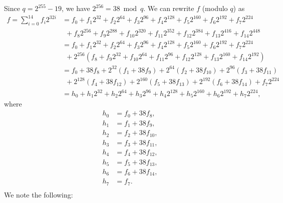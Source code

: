 \documentclass[a4paper, 12pt]{article}
\begin{document}
Since $q = 2^{255}-19$, we have $2^{256} = 38 \bmod q$. We can rewrite $f$ (modulo $q$) as
\begin{align*}
  f  = \sum^{14}_{i=0} f_i 2^{32i} &= f_0 + f_1 2^{32} + f_2 2^{64} + f_3 2^{96} + f_4 2^{128} +   f_5 2^{160} + f_6 2^{192}+ f_7 2^{224}\\
   &\ \ + f_8 2^{256} + f_9 2^{288} + f_{10} 2^{320} + f_{11} 2^{352} +   f_{12} 2^{384} + f_{13} 2^{416}+ f_{14} 2^{448}\\
   & = f_0 + f_1 2^{32} + f_2 2^{64} + f_3 2^{96} + f_4 2^{128} +   f_5 2^{160} + f_6 2^{192}+ f_7 2^{224}\\
   &\ \ + 2^{256} \left( f_8 + f_9 2^{32} + f_{10} 2^{64} + f_{11} 2^{96} +   f_{12} 2^{128} + f_{13} 2^{160}+ f_{14} 2^{192} \right)\\
   & = f_0 + 38f_8 + 2^{32}\left(f_1 + 38 f_9\right)  +  2^{64}\left( f_2 + 38 f_{10} \right) + 2^{96}\left( f_3 + 38 f_{11} \right)\\
   &\ \ +  2^{128}\left( f_4 + 38 f_{12}\right) + 2^{160}\left( f_5 + 38 f_{13} \right) + 2^{192}\left( f_6 + 38 f_{14} \right) + f_7 2^{224}\\
   & = h_0 + h_1 2^{32} + h_2 2^{64} + h_3 2^{96} + h_4 2^{128} +   h_5 2^{160} + h_6 2^{192}+ h_7 2^{224},
\end{align*}
where
\begin{align*}
  h_0 & = f_0 + 38 f_8,\\
  h_1 & = f_1 + 38 f_9,\\
  h_2 & = f_2 + 38 f_{10},\\
  h_3 & = f_3 + 38 f_{11},\\
  h_4 & = f_4 + 38 f_{12},\\
  h_5 & = f_5 + 38 f_{13},\\
  h_6 & = f_6 + 38 f_{14},\\
  h_7 & = f_7.\\
\end{align*}
We note the following:
\end{document}
